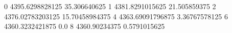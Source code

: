 0 4395.6298828125 35.306640625
1 4381.8291015625 21.505859375
2 4376.02783203125 15.70458984375
4 4363.69091796875 3.36767578125
6 4360.3232421875 0.0
8 4360.90234375 0.5791015625
